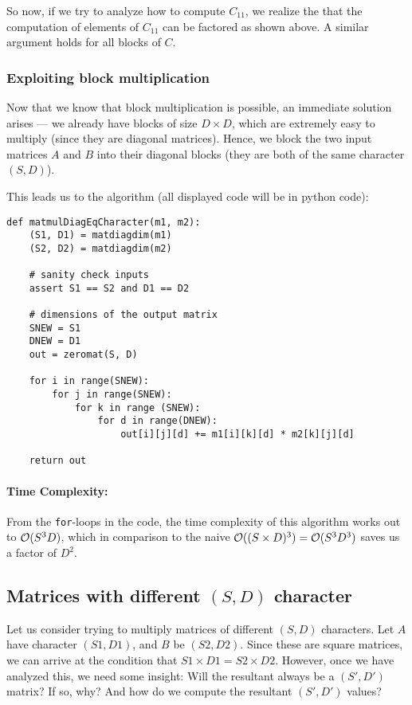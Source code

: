 \documentclass[11pt]{article}
\begin{document}
So now, if we try to analyze how to compute $C_{11}$, we realize the that
the computation of elements of $C_{11}$ can be factored as shown above. A
similar argument holds for all blocks of $C$.

\subsubsection{Exploiting block multiplication}

Now that we know that block multiplication is possible, an immediate solution
arises --- we already have blocks of size $D \times D$, which are extremely
easy to multiply (since they are diagonal matrices). Hence, we block the two
input matrices $A$ and $B$ into their diagonal blocks (they are both of the
same character $(S, D)$).

This leads us to the algorithm (all displayed code will be in python code):
\begin{verbatim}
def matmulDiagEqCharacter(m1, m2):
    (S1, D1) = matdiagdim(m1)
    (S2, D2) = matdiagdim(m2)

    # sanity check inputs
    assert S1 == S2 and D1 == D2

    # dimensions of the output matrix
    SNEW = S1
    DNEW = D1
    out = zeromat(S, D)

    for i in range(SNEW):
        for j in range(SNEW):
            for k in range (SNEW):
                for d in range(DNEW):
                    out[i][j][d] += m1[i][k][d] * m2[k][j][d]

    return out
\end{verbatim}

\paragraph{\textbf{Time Complexity:}}
From the \texttt{for}-loops in the code, the time complexity of this
algorithm works out to $\mathcal{O}(S^3D)$, which in comparison to the naive
$\mathcal{O}((S \times D)^3) = \mathcal{O}(S^3 D^3)$ saves us a factor of $D^2$.

\subsection{Matrices with different $(S, D)$ character}
Let us consider trying to multiply matrices of different $(S, D)$ characters.
Let $A$ have character $(S1, D1)$, and $B$ be $(S2, D2)$. Since these
are square matrices, we can arrive at the condition that $S1 \times D1 = S2
\times D2$.
However, once we have analyzed this, we need some insight: Will the resultant
always be a $(S', D')$ matrix? If so, why? And how do we compute the resultant
$(S', D')$ values?
\end{document}
